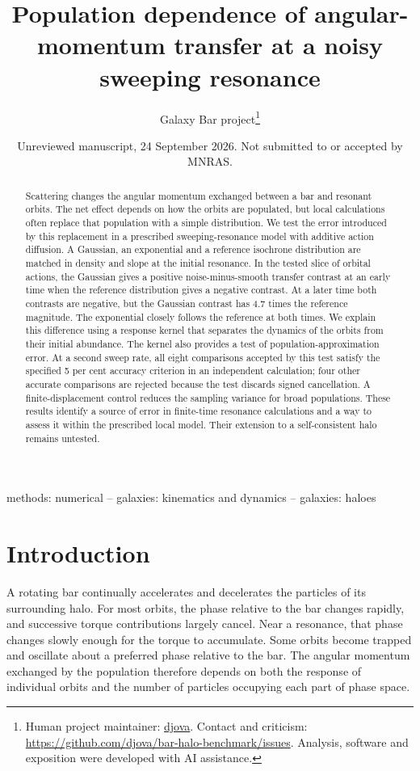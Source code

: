 \documentclass[fleqn,usenatbib]{mnras}
\title[Population dependence at a noisy resonance]{Population dependence of angular-momentum transfer at a noisy sweeping resonance}
\author[Galaxy Bar project]{Galaxy Bar project\thanks{Human project maintainer: \href{https://github.com/djova}{djova}.
Contact and criticism: \url{https://github.com/djova/bar-halo-benchmark/issues}.
Analysis, software and exposition were developed with AI assistance.}}
\date{Unreviewed manuscript, 24 September 2026. Not submitted to or accepted by MNRAS.}
\begin{document}
\label{firstpage}
\pagerange{\pageref{firstpage}--\pageref{LastPage}}
\maketitle
\raggedbottom

\begin{abstract}
Scattering changes the angular momentum exchanged between a bar and resonant orbits. The net effect depends on how the orbits are populated, but local calculations often replace that population with a simple distribution. We test the error introduced by this replacement in a prescribed sweeping-resonance model with additive action diffusion. A Gaussian, an exponential and a reference isochrone distribution are matched in density and slope at the initial resonance. In the tested slice of orbital actions, the Gaussian gives a positive noise-minus-smooth transfer contrast at an early time when the reference distribution gives a negative contrast. At a later time both contrasts are negative, but the Gaussian contrast has 4.7 times the reference magnitude. The exponential closely follows the reference at both times. We explain this difference using a response kernel that separates the dynamics of the orbits from their initial abundance. The kernel also provides a test of population-approximation error. At a second sweep rate, all eight comparisons accepted by this test satisfy the specified 5 per cent accuracy criterion in an independent calculation; four other accurate comparisons are rejected because the test discards signed cancellation. A finite-displacement control reduces the sampling variance for broad populations. These results identify a source of error in finite-time resonance calculations and a way to assess it within the prescribed local model. Their extension to a self-consistent halo remains untested.
\end{abstract}
\begin{keywords}
methods: numerical -- galaxies: kinematics and dynamics -- galaxies: haloes
\end{keywords}
\section{Introduction}\label{previous-work}

A rotating bar continually accelerates and decelerates the particles of its surrounding halo. For most orbits, the phase relative to the bar changes rapidly, and successive torque contributions largely cancel. Near a resonance, that phase changes slowly enough for the torque to accumulate. Some orbits become trapped and oscillate about a preferred phase relative to the bar. The angular momentum exchanged by the population therefore depends on both the response of individual orbits and the number of particles occupying each part of phase space.
\end{document}
